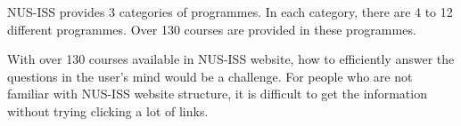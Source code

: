 NUS-ISS provides 3 categories of programmes. In each category, there are 4 to 12 different programmes. Over 130 courses are provided in these programmes.

With over 130 courses available in NUS-ISS website, how to efficiently answer the questions in the user's mind would be a challenge. For people who are not familiar with NUS-ISS website structure, it is difficult to get the information without trying clicking a lot of links.
